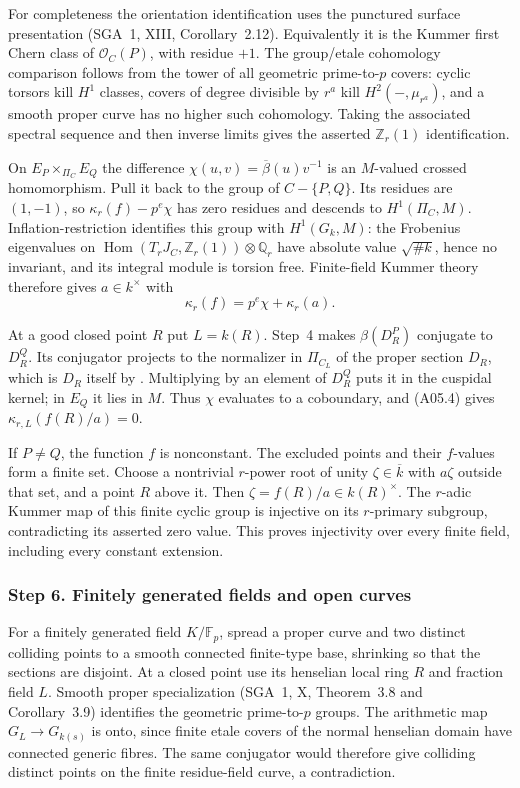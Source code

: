 For completeness the orientation identification uses the
punctured surface presentation (SGA~1, XIII, Corollary~2.12).
Equivalently it is the Kummer first Chern class of
$\mathcal O_C(P)$, with residue $+1$. The group/etale
cohomology comparison follows from the tower of all geometric
prime-to-$p$ covers: cyclic torsors kill $H^1$ classes, covers
of degree divisible by $r^a$ kill $H^2(-,\mu_{r^a})$, and a
smooth proper curve has no higher such cohomology. Taking the
associated spectral sequence and then inverse limits gives
the asserted $\mathbb Z_r(1)$ identification.

On $E_P\times_{\Pi_C}E_Q$ the difference
$\chi(u,v)=\overline\beta(u)v^{-1}$ is an $M$-valued
crossed homomorphism. Pull it back to the group of
$C-\{P,Q\}$. Its residues are $(1,-1)$, so
$\kappa_r(f)-p^e\chi$ has zero residues and descends to
$H^1(\Pi_C,M)$. Inflation-restriction identifies this group
with $H^1(G_k,M)$: the Frobenius eigenvalues on
$\operatorname{Hom}(T_rJ_C,\mathbb Z_r(1))\otimes\mathbb Q_r$
have absolute value $\sqrt{\#k}$, hence no invariant, and its
integral module is torsion free. Finite-field Kummer theory
therefore gives $a\in k^\times$ with
\[
 \kappa_r(f)=p^e\chi+\kappa_r(a). \tag{A05.4}
\]

At a good closed point $R$ put $L=k(R)$. Step~4 makes
$\beta(D_R^P)$ conjugate to $D_R^Q$. Its conjugator projects
to the normalizer in $\Pi_{C_L}$ of the proper section $D_R$, which is $D_R$
itself by \cite[Lemma~1.7]{ST2009}. Multiplying by an element
of $D_R^Q$ puts it in the cuspidal kernel; in $E_Q$ it lies
in $M$. Thus $\chi$ evaluates to a coboundary, and (A05.4)
gives $\kappa_{r,L}(f(R)/a)=0$.

If $P\ne Q$, the function $f$ is nonconstant. The excluded
points and their $f$-values form a finite set. Choose a
nontrivial $r$-power root of unity $\zeta\in\overline k$
with $a\zeta$ outside that set, and a point $R$ above it.
Then $\zeta=f(R)/a\in k(R)^\times$. The $r$-adic Kummer
map of this finite cyclic group is injective on its $r$-primary
subgroup, contradicting its asserted zero value. This proves
injectivity over every finite field, including every constant
extension.

\subsubsection*{Step 6. Finitely generated fields and open curves}
For a finitely generated field $K/\mathbb F_p$, spread a proper
curve and two distinct colliding points to a smooth connected
finite-type base, shrinking so that the sections are disjoint.
At a closed point use its henselian local ring $R$ and fraction
field $L$. Smooth proper specialization (SGA~1, X,
Theorem~3.8 and Corollary~3.9) identifies the geometric
prime-to-$p$ groups. The arithmetic map $G_L\to G_{k(s)}$
is onto, since finite etale covers of the normal henselian
domain have connected generic fibres. The same conjugator
would therefore give colliding distinct points on the finite
residue-field curve, a contradiction.

